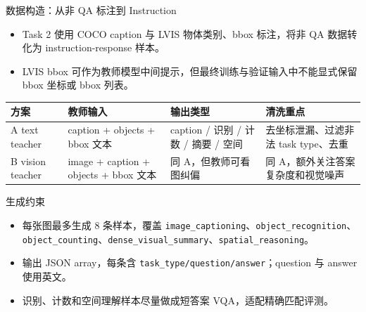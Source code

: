 \documentclass{beamer}
\newcommand{\smalltab}{\scriptsize}
\begin{document}
\begin{frame}[shrink=5]{数据构造：从非 QA 标注到 Instruction}
\small
\begin{itemize}
\item Task 2 使用 COCO caption 与 LVIS 物体类别、bbox 标注，将非 QA 数据转化为 instruction-response 样本。
\item LVIS bbox 可作为教师模型中间提示，但最终训练与验证输入中不能显式保留 bbox 坐标或 bbox 列表。
\end{itemize}
\smalltab
\begin{tabular}{p{}p{}p{}p{}}
\toprule
方案 & 教师输入 & 输出类型 & 清洗重点 \\
\midrule
A text teacher & caption + objects + bbox 文本 & caption / 识别 / 计数 / 摘要 / 空间 & 去坐标泄漏、过滤非法 task type、去重 \\
B vision teacher & image + caption + objects + bbox 文本 & 同 A，但教师可看图纠偏 & 同 A，额外关注答案复杂度和视觉噪声 \\
\bottomrule
\end{tabular}
\vspace{0.4em}
\begin{block}{生成约束}
\begin{itemize}
\item 每张图最多生成 8 条样本，覆盖 \texttt{image\_captioning}、\texttt{object\_recognition}、\texttt{object\_counting}、\texttt{dense\_visual\_summary}、\texttt{spatial\_reasoning}。
\item 输出 JSON array，每条含 \texttt{task\_type/question/answer}；question 与 answer 使用英文。
\item 识别、计数和空间理解样本尽量做成短答案 VQA，适配精确匹配评测。
\end{itemize}
\end{block}
\end{frame}
\end{document}
